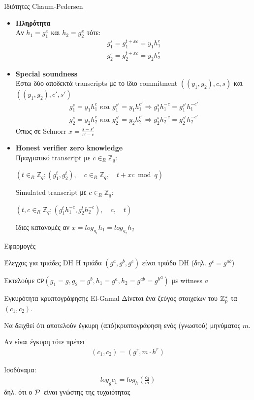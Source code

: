 \documentclass[10pt,handout]{beamer}
\begin{document}
\begin{frame}[allowframebreaks]{Ιδιότητες Chaum-Pedersen}
\begin{itemize}
\item \textbf{Πληρότητα}\\
Αν $h_1 = g_1^x$ και $h_2 = g_2^x$ τότε:
\begin{align*}
g_1^s = g_1^{t+xc} = y_1h_1^c \\
g_2^s = g_2^{t+xc} = y_2h_2^c
\end{align*}
\item \textbf{Special soundness}\\
Έστω δύο αποδεκτά transcripts με το ίδιο commitment $((y_1,y_2),c,s)$ και $((y_1,y_2),c',s')$
\begin{align*}
g_1^s =  y_1h_1^c \text{  και  } g_1^{s'} =  y_1h_1^{c'} \Rightarrow g_1^s h_1^{-c} = g_1^{s'} h_1^{-c'} \\
g_2^s =  y_2h_2^c \text{  και  } g_2^{s'} =  y_2h_2^{c'} \Rightarrow g_2^s h_2^{-c} = g_2^{s'} h_2^{-c'}
\end{align*}
Όπως σε Schnorr $x = \frac{s-s'}{c'-c}$
\framebreak
\item \textbf{Honest verifier zero knowledge}\\
Πραγματικό transcript με $c \in_R \mathbb{Z}_q$: 
\begin{center}
$(t \in_R \mathbb{Z}_q;(g_1^t,g_2^t), \quad c \in_R \mathbb{Z}_q,\quad t+xc \bmod{q})$
\end{center}
Simulated transcript με $c \in_R \mathbb{Z}_q$: 
\begin{center}
$(t,c \in_R \mathbb{Z}_q;(g_1^t h_1^{-c},g_2^th_2^{-c}), \quad c, \quad t)$
\end{center}
Ίδιες κατανομές αν $x=log_{g_1}{h_1}=log_{g_2}{h_2}$
\end{itemize}
\end{frame}

\begin{frame}{Εφαρμογές}
\begin{small}
\begin{block}{Έλεγχος για τριάδες DH}
Η τριάδα $(g^a,g^b,g^c)$ είναι τριάδα DH (δηλ. $g^c = g^{ab}$) 
\end{block}
\pause
Εκτελούμε $\mathtt{CP}(g_1 = g,g_2 = g^b,h_1 = g^a, h_2 = g^{ab} = {g^b}^a)$ με witness $a$
\begin{block}{Εγκυρότητα κρυπτογράφησης El-Gamal}
Δίνεται ένα ζεύγος στοιχείων του $\mathbb{Z}^*_{p}$ τα $(c_1,c_2)$. 

Να δειχθεί ότι αποτελούν έγκυρη (από)κρυπτογράφηση ενός (γνωστού) μηνύματος $m$.
\end{block}
\pause
Αν είναι έγκυρη τότε πρέπει
\begin{align*}
(c_1,c_2) = (g^r, m \cdot h^r)
\end{align*}

Ισοδύναμα: 
\begin{align*}
log_g c_1 = log_h (\frac{c_2}{m}) 
\end{align*}
δηλ. ότι ο $\mathcal{P}\,$ είναι γνώστης της τυχαιότητας
\end{small} 
\end{frame}
\end{document}
